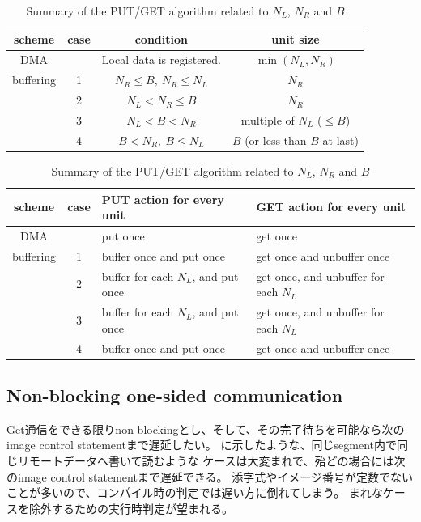 \begin{table}[tbh]
 \caption{Summary of the PUT/GET algorithm related to $N_L$, $N_R$ and $B$}
 \label{tab:putget}
 \begin{flushleft}
  \begin{tabular}{|@{~}c@{~}|c||@{~}c@{~}|@{~}c@{~}|}
\hline
scheme &
case &
condition &
unit size \\
\hline
\hline
DMA &
&
Local data is registered. &
$\min(N_L, N_R)$ \\
\hline
buffering &
1 & 
$N_R \leq B,~ N_R \leq N_L$ &
$N_R$ \\
\cline{2-4}
&
2 &
$N_L < N_R \leq B$ &
$N_R$ \\
\cline{2-4}
&
3 &
$N_L < B < N_R$ &
multiple of $N_L$ ($\leq B$) \\
\cline{2-4}
&
4 &
$B < N_R,~ B \leq N_L$ &
$B$ (or less than $B$ at last) \\
\hline
  \end{tabular}
 \end{flushleft}
 \begin{flushleft}
  \begin{tabular}{|@{~}c@{~}|c||@{~~}l@{~~}|@{~~}l@{~~}|}
\hline
scheme &
case &
PUT action for every unit &
GET action for every unit \\
\hline
\hline
DMA &
&
put once &
get once \\
\hline
buffering &
1 &
buffer once and put once &
get once and unbuffer once \\
\cline{2-4}
&
2 &
buffer for each $N_L$, and put once &
get once, and unbuffer for each $N_L$ \\
\cline{2-4}
&
3 &
buffer for each $N_L$, and put once &
get once, and unbuffer for each $N_L$ \\
\cline{2-4}
&
4 &
buffer once and put once &
get once and unbuffer once \\
\hline
  \end{tabular}
 \end{flushleft}
\end{table}



\subsection{Non-blocking one-sided communication}

Get通信をできる限りnon-blockingとし、そして、その完了待ちを可能なら次のimage control statementまで遅延したい。
に示したような、同じsegment内で同じリモートデータへ書いて読むような
ケースは大変まれで、殆どの場合には次のimage control statementまで遅延できる。
添字式やイメージ番号が定数でないことが多いので、コンパイル時の判定では遅い方に倒れてしまう。
まれなケースを除外するための実行時判定が望まれる。

